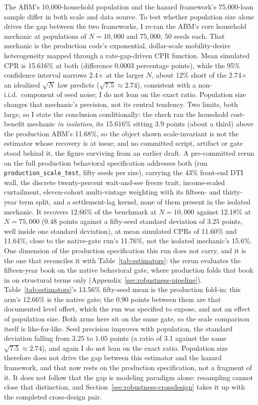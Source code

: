 \documentclass[12pt]{article}
\begin{document}
The ABM's 10,000-household population and the hazard framework's 75,000-loan sample differ in both scale and data source. To test whether population size alone drives the gap between the two frameworks, I re-ran the ABM's core household mechanic at populations of $N = 10{,}000$ and $75{,}000$, 50 seeds each. That mechanic is the production code's exponential, dollar-scale mobility-desire heterogeneity mapped through a rate-gap-driven CPR function. Mean simulated CPR is 15.616\% at both (difference 0.0003 percentage points), while the 95\% confidence interval narrows 2.4$\times$ at the larger $N$, about 12\% short of the 2.74$\times$ an idealized $\sqrt{N}$ law predicts ($\sqrt{7.5} \approx 2.74$), consistent with a non-i.i.d.\ component of seed noise; I do not lean on the exact ratio. Population size changes that mechanic's precision, not its central tendency. Two limits, both large, so I state the conclusion conditionally: the check ran the household cost-benefit mechanic \emph{in isolation}, its 15.616\% sitting 3.9 points (about a third) above the production ABM's 11.68\%, so the object shown scale-invariant is not the estimator whose recovery is at issue; and no committed script, artifact or gate stood behind it, the figure surviving from an earlier draft. A pre-committed rerun on the full production behavioral specification addresses both (run \texttt{production\_scale\_test}, fifty seeds per size), carrying the 43\% front-end DTI wall, the discrete twenty-percent wait-and-see freeze trait, income-scaled curtailment, eleven-cohort multi-vintage weighting with its fifteen- and thirty-year term split, and a settlement-lag kernel, none of them present in the isolated mechanic. It recovers 12.66\% of the benchmark at $N = 10{,}000$ against 12.18\% at $N = 75{,}000$ ($0.48$ points against a fifty-seed standard deviation of $3.25$ points, well inside one standard deviation), at mean simulated CPRs of 11.60\% and 11.64\%, close to the native-gate run's 11.76\%, not the isolated mechanic's 15.6\%. One dimension of the production specification this run does not carry, and it is the one that reconciles it with Table~\ref{tab:estimators}: the rerun evaluates the fifteen-year book on the native behavioral gate, where production folds that book in on structural terms only (Appendix~\ref{sec:robustness-pipeline}). Table~\ref{tab:estimators}'s 13.56\% fifty-seed mean is the production fold-in; this arm's 12.66\% is the native gate; the 0.90 points between them are that documented level offset, which the run was specified to expose, and not an effect of population size. Both arms here sit on the same gate, so the scale comparison itself is like-for-like. Seed precision improves with population, the standard deviation falling from $3.25$ to $1.05$ points (a ratio of 3.1 against the same $\sqrt{7.5} \approx 2.74$), and again I do not lean on the exact ratio. Population size therefore does not drive the gap between this estimator and the hazard framework, and that now rests on the production specification, not a fragment of it. It does not follow that the gap is modeling paradigm alone: resampling cannot close that distinction, and Section~\ref{sec:robustness-crossdesign} takes it up with the completed cross-design pair.
\end{document}
